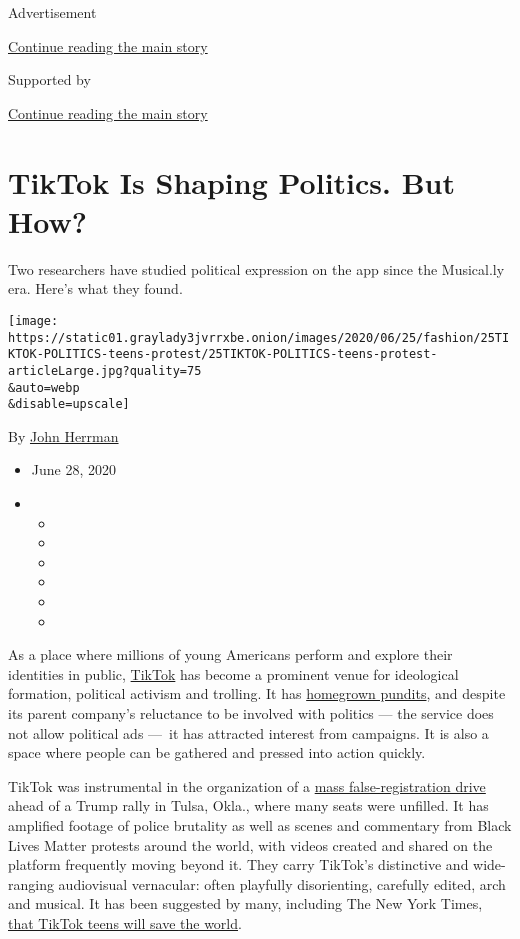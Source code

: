 Advertisement

\protect\hyperlink{after-top}{Continue reading the main story}

Supported by

\protect\hyperlink{after-sponsor}{Continue reading the main story}

\hypertarget{tiktok-is-shaping-politics-but-how}{%
\section{TikTok Is Shaping Politics. But
How?}\label{tiktok-is-shaping-politics-but-how}}

Two researchers have studied political expression on the app since the
Musical.ly era. Here's what they found.

\texttt{[image: https://static01.graylady3jvrrxbe.onion/images/2020/06/25/fashion/25TIKTOK-POLITICS-teens-protest/25TIKTOK-POLITICS-teens-protest-articleLarge.jpg?quality=75\\\&auto=webp\\\&disable=upscale]}

By \href{https://www.nytimes3xbfgragh.onion/by/john-herrman}{John
Herrman}

\begin{itemize}
\item
  June 28, 2020
\item
  \begin{itemize}
  \item
  \item
  \item
  \item
  \item
  \item
  \end{itemize}
\end{itemize}

As a place where millions of young Americans perform and explore their
identities in public,
\href{https://www.nytimes3xbfgragh.onion/2020/08/03/technology/trump-tiktok-microsoft.html}{TikTok}
has become a prominent venue for ideological formation, political
activism and trolling. It has
\href{https://www.nytimes3xbfgragh.onion/2020/02/27/style/tiktok-politics-bernie-trump.html}{homegrown
pundits}, and despite its parent company's reluctance to be involved
with politics --- the service does not allow political ads ---~it has
attracted interest from campaigns. It is also a space where people can
be gathered and pressed into action quickly.

TikTok was instrumental in the organization of a
\href{https://www.nytimes3xbfgragh.onion/2020/06/21/style/tiktok-trump-rally-tulsa.html}{mass
false-registration drive} ahead of a Trump rally in Tulsa, Okla., where
many seats were unfilled. It has amplified footage of police brutality
as well as scenes and commentary from Black Lives Matter protests around
the world, with videos created and shared on the platform frequently
moving beyond it. They carry TikTok's distinctive and wide-ranging
audiovisual vernacular: often playfully disorienting, carefully edited,
arch and musical. It has been suggested by many, including The New York
Times,
\href{https://www.nytimes3xbfgragh.onion/2020/06/22/opinion/trump-protest-gen-z.html}{that
TikTok teens will save the world}.

